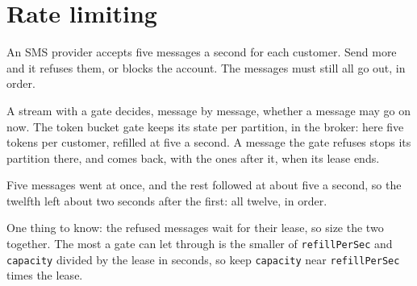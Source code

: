 %

\section{Rate limiting}

An SMS provider accepts five messages a second for each customer. Send more and it refuses them,
or blocks the account. The messages must still all go out, in order.

A stream with a gate decides, message by message, whether a message may go on now. The token
bucket gate keeps its state per partition, in the broker: here five tokens per customer, refilled
at five a second. A message the gate refuses stops its partition there, and comes back, with the
ones after it, when its lease ends.


Five messages went at once, and the rest followed at about five a second, so the twelfth left
about two seconds after the first: all twelve, in order.



One thing to know: the refused messages wait for their lease, so size the two together. The most a
gate can let through is the smaller of \texttt{refillPerSec} and \texttt{capacity} divided by the
lease in seconds, so keep \texttt{capacity} near \texttt{refillPerSec} times the lease.
